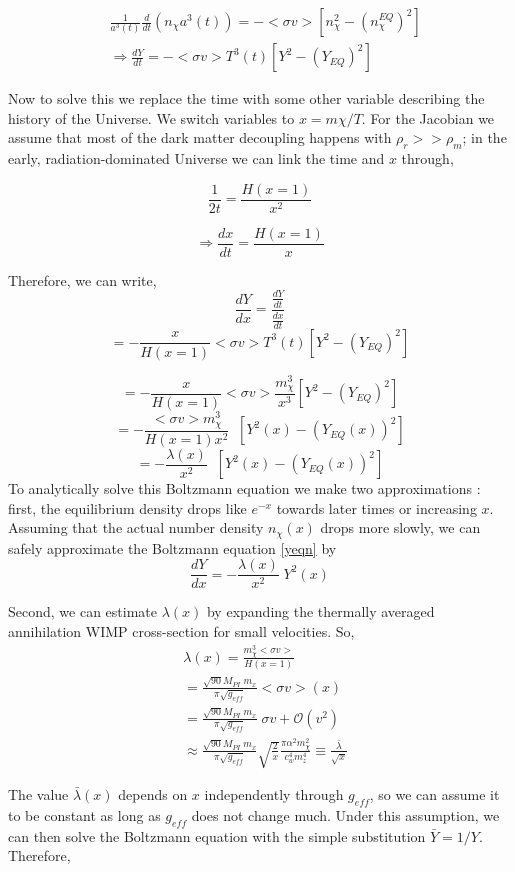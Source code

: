 \documentclass[12pt]{report}
\begin{document}
\begin{align}
&\frac{1}{a^3(t)} \frac{d}{dt} (n_\chi a^3(t))= -<\sigma v> [n^2_\chi-(n^{EQ}_\chi)^2] \\
&\Rightarrow \frac{dY}{dt} = -<\sigma v> T^3(t) [Y^2- (Y_{EQ})^2] \label{yeqn}
\end{align}

Now to solve this we replace the time with some other variable describing the history of
the Universe. We switch variables to $x = m\chi /T$. For the Jacobian we assume that most of the dark matter
decoupling happens with $\rho_r >> \rho_m $; in the early, radiation-dominated Universe we can link the time and $x$ through,  \cite{dmtheory4}

$$\frac{1}{2t} = \frac{H(x=1)}{x^2}$$

$$\Rightarrow \frac{dx}{dt}= \frac{H(x=1)}{x}$$

Therefore, we can write,
 $$\frac{dY}{dx} =\frac{ \frac{dY}{dt}}{\frac{dx}{dt}} $$
 $$=- \frac{x}{H(x=1)} <\sigma v> T^3(t) [Y^2- (Y_{EQ})^2]$$

$$=-\frac{x}{H(x=1)} <\sigma v> \frac{m^3_\chi}{x^3} [Y^2- (Y_{EQ})^2]$$
$$= - \frac{<\sigma v> m^3_\chi}{H(x=1) x^2}\;\; [Y^2(x)- (Y_{EQ}(x))^2] $$
$$=- \frac{\lambda(x)}{x^2}\; \; [Y^2(x)- (Y_{EQ}(x))^2] $$
To analytically solve this Boltzmann equation we make two approximations \cite{dmtheory4}: first, the equilibrium density drops like $e^{−x}$ towards later times or increasing $x$. Assuming that the actual number density $n_{\chi}(x)$ drops more slowly, we can safely approximate the Boltzmann equation \ref{yeqn} by
\begin{equation}
\frac{dY}{dx}=-\frac{\lambda(x)}{x^2} \; Y^2(x)
\end{equation}

Second, we can estimate $\lambda(x)$ by expanding the thermally averaged annihilation WIMP cross-section for small velocities. So,
\begin{align*}
& \lambda(x) = \frac{m^3_\chi <\sigma v>}{H(x=1)}\\
& =\frac{\sqrt{90} M_{PI}\; m_x}{\pi \sqrt{g_{eff}}} <\sigma v> (x)\\
&= \frac{\sqrt{90} M_{PI}\; m_x}{\pi \sqrt{g_{eff}}} \; \sigma v + \mathcal{O}(v^2) \\
& \approx \frac{\sqrt{90} M_{PI}\; m_x}{\pi \sqrt{g_{eff}}} \sqrt{\frac{2}{x}} \frac{\pi \alpha^2 m^2_\chi}{c^4_w m^4_z} \equiv \frac{\bar{\lambda}}{\sqrt{x}}
\end{align*}

The value $\bar{\lambda}(x)$ depends on $x$ independently through $g_{eff}$, so we can assume it to be constant as long as $g_{eff}$ does not change much. Under this assumption, we can then solve the Boltzmann equation with the simple substitution
$\bar{Y} = 1/Y$. Therefore, 
\end{document}
